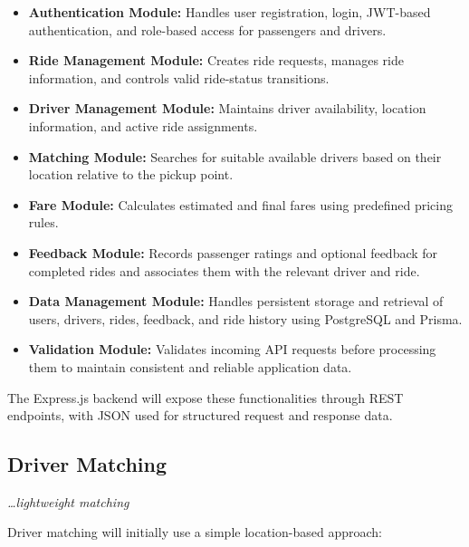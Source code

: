 \documentclass[11pt,a4paper]{article}
\newcommand{\BvrHint}[1]{%
  {\normalfont\normalsize\itshape\hfill #1}}
\begin{document}
\begin{itemize}

    \item \textbf{Authentication Module:} Handles user registration,
    login, JWT-based authentication, and role-based access for
    passengers and drivers.

    \item \textbf{Ride Management Module:} Creates ride requests,
    manages ride information, and controls valid ride-status
    transitions.

    \item \textbf{Driver Management Module:} Maintains driver
    availability, location information, and active ride assignments.

    \item \textbf{Matching Module:} Searches for suitable available
    drivers based on their location relative to the pickup point.

    \item \textbf{Fare Module:} Calculates estimated and final fares
    using predefined pricing rules.

    \item \textbf{Feedback Module:} Records passenger ratings and
    optional feedback for completed rides and associates them with
    the relevant driver and ride.

    \item \textbf{Data Management Module:} Handles persistent storage
    and retrieval of users, drivers, rides, feedback, and ride history
    using PostgreSQL and Prisma.

    \item \textbf{Validation Module:} Validates incoming API
    requests before processing them to maintain consistent and
    reliable application data.

\end{itemize}

The Express.js backend will expose these functionalities through
REST endpoints, with JSON used for structured request and response
data.


\subsection{Driver Matching}
\BvrHint{\ldots lightweight matching}

Driver matching will initially use a simple location-based approach:
\end{document}
